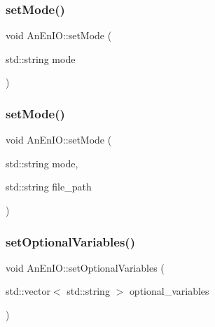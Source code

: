 \subsubsection{\texorpdfstring{set\+Mode()}{setMode()}\hspace{0.1cm}{\footnotesize\ttfamily [1/2]}}
{\footnotesize\ttfamily void An\+En\+I\+O\+::set\+Mode (\begin{DoxyParamCaption}\item[{std\+::string}]{mode }\end{DoxyParamCaption})}

\mbox{\label{class_an_en_i_o_aa199cf152c5c165e9c98d237830ba9ec}} 
\subsubsection{\texorpdfstring{set\+Mode()}{setMode()}\hspace{0.1cm}{\footnotesize\ttfamily [2/2]}}
{\footnotesize\ttfamily void An\+En\+I\+O\+::set\+Mode (\begin{DoxyParamCaption}\item[{std\+::string}]{mode,  }\item[{std\+::string}]{file\+\_\+path }\end{DoxyParamCaption})}

\mbox{\label{class_an_en_i_o_abc499df15eac5fa3f203267723f5edfa}} 
\subsubsection{\texorpdfstring{set\+Optional\+Variables()}{setOptionalVariables()}}
{\footnotesize\ttfamily void An\+En\+I\+O\+::set\+Optional\+Variables (\begin{DoxyParamCaption}\item[{std\+::vector$<$ std\+::string $>$}]{optional\+\_\+variables }\end{DoxyParamCaption})}

\mbox{\label{class_an_en_i_o_a239ea94b3648006920bcdcded4040ad3}} 
